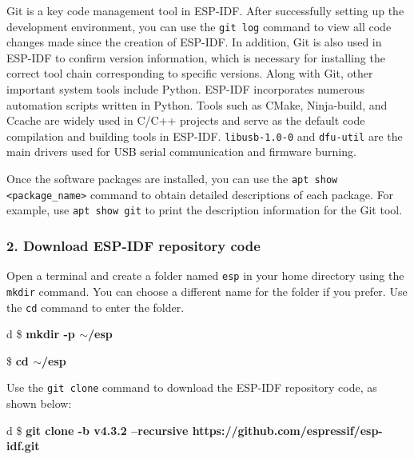 \documentclass[a4paper,12pt]{book}
\begin{document}
Git is a key code management tool in ESP-IDF. After successfully setting up the development environment, you can use the \verb|git log| command to view all code changes made since the creation of ESP-IDF. In addition, Git is also used in ESP-IDF to confirm version information, which is necessary for installing the correct tool chain corresponding to specific versions. Along with Git, other important system tools include Python. ESP-IDF incorporates numerous automation scripts written in Python. Tools such as CMake, Ninja-build, and Ccache are widely used in C/C++ projects and serve as the default code compilation and building tools in ESP-IDF. \verb|libusb-1.0-0| and \verb|dfu-util| are the main drivers used for USB serial communication and firmware burning.

Once the software packages are installed, you can use the \verb|apt show <package_name>| command to obtain detailed descriptions of each package. For example, use \verb|apt show git| to print the description information for the Git tool.


\subsubsection{2. Download ESP-IDF repository code}
Open a terminal and create a folder named \verb|esp| in your home directory using the \verb|mkdir| command. You can choose a different name for the folder if you prefer. Use the \verb|cd| command to enter the folder.

\begin{codebloc}
\begin{tabular}{d}
\$ \textbf{mkdir -p $\sim$/esp}

\$ \textbf{cd $\sim$/esp}
\end{tabular}
\end{codebloc}

Use the \verb|git clone| command to download the ESP-IDF repository code, as shown below:

\begin{codebloc}
\begin{tabular}{d}
\$ \textbf{git clone -b v4.3.2 --recursive https://github.com/espressif/esp-idf.git}
\end{tabular}
\end{codebloc}
\end{document}
